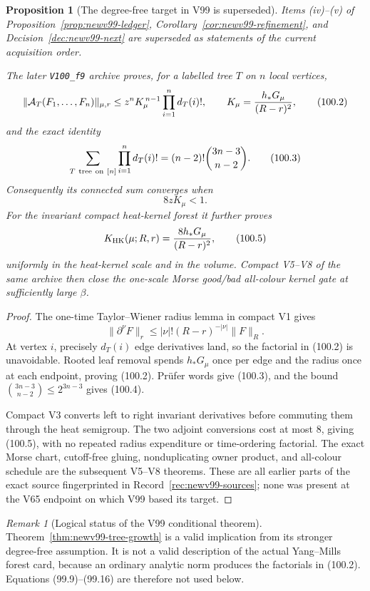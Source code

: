 \documentclass[11pt,oneside]{article}
\newtheorem{proposition}[theorem]{Proposition}
\theoremstyle{definition}
\theoremstyle{remark}
\newtheorem{remark}[theorem]{Remark}
\begin{document}
\begin{proposition}[The degree-free target in V99 is superseded]
\label{prop:newv100-v99-erratum}
Items (iv)--(v) of Proposition~\ref{prop:newv99-ledger},
Corollary~\ref{cor:newv99-refinement}, and
Decision~\ref{dec:newv99-next} are superseded as statements of the
current acquisition order.

The later \texttt{V100\_f9} archive proves, for a labelled tree
\(T\) on \(n\) local vertices,
\[
 \|{\cal A}_T(F_1,\ldots,F_n)\|_{\mu,r}
 \le z^nK_\mu^{\,n-1}\prod_{i=1}^n d_T(i)!,
 \qquad
 K_\mu=\frac{h_*G_\mu}{(R-r)^2},                    \tag{100.2}
\]
and the exact identity
\[
 \sum_{T\ {\rm tree\ on}\ [n]}
 \prod_{i=1}^n d_T(i)!
 =(n-2)!\binom{3n-3}{n-2}.                         \tag{100.3}
\]
Consequently its connected sum converges when
\[
                         8zK_\mu<1.                \tag{100.4}
\]
For the invariant compact heat-kernel forest it further proves
\[
 K_{\rm HK}(\mu;R,r)
 =\frac{8h_*G_\mu}{(R-r)^2},                        \tag{100.5}
\]
uniformly in the heat-kernel scale and in the volume.  Compact
V5--V8 of the same archive then close the one-scale Morse
good/bad all-colour kernel gate at sufficiently large \(\beta\).
\end{proposition}

\begin{proof}
The one-time Taylor--Wiener radius lemma in compact V1 gives
\[
 \|\partial^\nu F\|_r
 \le |\nu|!(R-r)^{-|\nu|}\|F\|_R.                  \tag{100.6}
\]
At vertex \(i\), precisely \(d_T(i)\) edge derivatives land, so
the factorial in (100.2) is unavoidable.  Rooted leaf removal
spends \(h_*G_\mu\) once per edge and the radius once at each
endpoint, proving (100.2).  Prüfer words give (100.3), and the
bound
\(\binom{3n-3}{n-2}\le2^{3n-3}\) gives (100.4).

Compact V3 converts left to right invariant derivatives before
commuting them through the heat semigroup.  The two adjoint
conversions cost at most \(8\), giving (100.5), with no repeated
radius expenditure or time-ordering factorial.  The exact Morse
chart, cutoff-free gluing, nonduplicating owner product, and
all-colour schedule are the subsequent V5--V8 theorems.  These are
all earlier parts of the exact source fingerprinted in
Record~\ref{rec:newv99-sources}; none was present at the V65
endpoint on which V99 based its target.
\end{proof}

\begin{remark}[Logical status of the V99 conditional theorem]
\label{rem:newv100-v99-logic}
Theorem~\ref{thm:newv99-tree-growth} is a valid implication from
its stronger degree-free assumption.  It is not a valid description
of the actual Yang--Mills forest card, because an ordinary analytic
norm produces the factorials in (100.2).  Equations
(99.9)--(99.16) are therefore not used below.
\end{remark}
\end{document}
